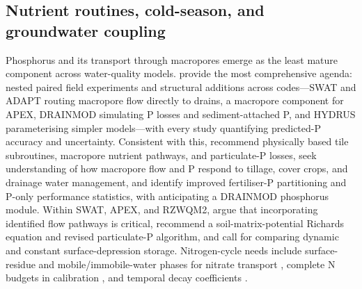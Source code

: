 \subsection{Nutrient routines, cold-season, and groundwater coupling}

Phosphorus and its transport through macropores emerge as the least mature
component across water-quality models. \textcite{Radcliffe2015} provide the most
comprehensive agenda: nested paired field experiments and structural additions
across codes---SWAT and ADAPT routing macropore flow directly to drains, a
macropore component for APEX, DRAINMOD simulating P losses and sediment-attached
P, and HYDRUS parameterising simpler models---with every study quantifying
predicted-P accuracy and uncertainty. Consistent with this,
\textcite{Guo2020b} recommend physically based tile subroutines, macropore
nutrient pathways, and particulate-P losses, \textcite{Ford2017} seek
understanding of how macropore flow and P respond to tillage, cover crops, and
drainage water management, and \textcite{BinShokrana2023b} identify improved
fertiliser-P partitioning and P-only performance statistics, with
\textcite{Gowda2012} anticipating a DRAINMOD phosphorus module. Within SWAT,
APEX, and RZWQM2, \textcite{Williams2016} argue that incorporating identified
flow pathways is critical, \textcite{Qi2018} recommend a soil-matrix-potential
Richards equation and revised particulate-P algorithm, and
\textcite{Moriasi2012} call for comparing dynamic and constant surface-depression
storage. Nitrogen-cycle needs include surface-residue and mobile/immobile-water
phases for nitrate transport \parencite{Malone2017}, complete N budgets in
calibration \parencite{Gillette2018}, and temporal decay coefficients
\parencite{Rudra2005}.

